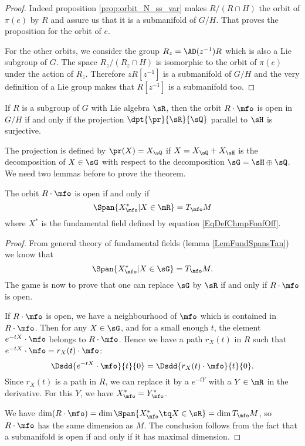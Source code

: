 \begin{proof}
 Indeed proposition \ref{prop:orbit_N_ss_var} makes $R/(R\cap H)$ the orbit of $\pi(e)$ by $R$ and assure us that it is a submanifold of $G/H$. That proves the proposition for the orbit of $e$. 

For the other orbits, we consider the group $R_z=\AD(z^{-1})R$ which is also a Lie  subgroup of $G$. The space $R_z/(R_z\cap H)$ is isomorphic to the orbit of $\pi(e)$ under the action of $R_z$. Therefore $zR[z^{-1}]$ is a submanifold of $G/H$ and the very definition of a Lie group makes that  $R[z^{-1}]$ is a submanifold too.

\end{proof}

\begin{theorem} \label{tho:pr_ouvert}
If $R$ is a subgroup of $G$ with Lie algebra $\sR$, then the orbit $R\cdot \mfo$ is open in $G/H$ if and only if the projection $\dpt{\pr}{\sR}{\sQ}$ parallel to $\sH$ is surjective.
\end{theorem}

The projection is defined by $\pr(X)=X_{\sQ}$ if $X=X_{\sQ}+X_{\sH}$ is the decomposition of $X\in\sG$ with respect to the decomposition $\sG=\sH\oplus\sQ$. We need two lemmas before to prove the theorem.

\begin{lemma}
The orbit $R\cdot\mfo$ is open if and only if
\[
    \Span\{X^*_{\mfo}|X\in\mR\}=T_{\mfo}M
\]
where $X^*$ is the fundamental field defined by equation \eqref{EqDefChmpFonfOff}.
\label{lem:equiv_1}
\end{lemma}

\begin{proof}
From general theory of fundamental fields (lemma \ref{LemFundSpansTan}) we know that
\[
\Span\{X^*_{\mfo}|X\in\sG\}=T_{\mfo}M.
\]
The game is now to prove that one can replace $\sG$ by $\sR$ if and only if $R\cdot \mfo$ is open.

If $R\cdot\mfo$ is open, we have a neighbourhood of $\mfo$ which is contained in $R\cdot\mfo$. Then for any $X\in\sG$, and for a small enough $t$, the element $e^{-tX}\cdot\mfo$ belongs to $R\cdot\mfo$. Hence we have a path $r_X(t)$ in $R$ such that $e^{-tX}\cdot\mfo=r_X(t)\cdot\mfo$:
\[
      \Dsdd{e^{-tX}\cdot\mfo}{t}{0}=\Dsdd{r_X(t)\cdot\mfo}{t}{0}.
\]
Since $r_X(t)$ is a path in $R$, we can replace it by a $e^{-tY}$ with a $Y\in\mR$ in the derivative. For this $Y$, we have $X^*_{\mfo}=Y^*_{\mfo}$.

 We have $\dim(R\cdot\mfo)=\dim\Span\{ X^*_{\mfo}\tq X\in\sR \}=\dim T_{\mfo}M$,
so $R\cdot\mfo$ has the same dimension as $M$. The conclusion follows from the fact that a submanifold is open if and only if it has maximal dimension.

\end{proof}

